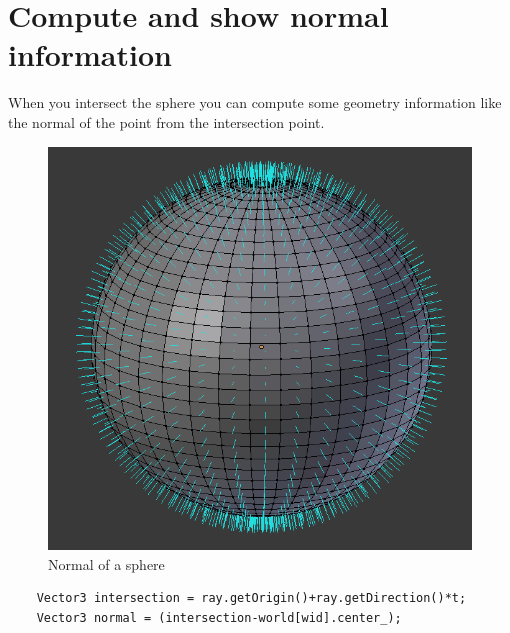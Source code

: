 \documentclass{article}
\begin{document}
\section{Compute and show normal information}
When you intersect the sphere you can compute some geometry information like the normal of the point from the intersection point.
\begin{figure}[h]
	\centering
	\includegraphics[scale=0.4]{figures/normal.png}
	\caption{Normal of a sphere}
\end{figure}
\begin{lstlisting}
	Vector3 intersection = ray.getOrigin()+ray.getDirection()*t;
	Vector3 normal = (intersection-world[wid].center_);
\end{lstlisting}
\end{document}
